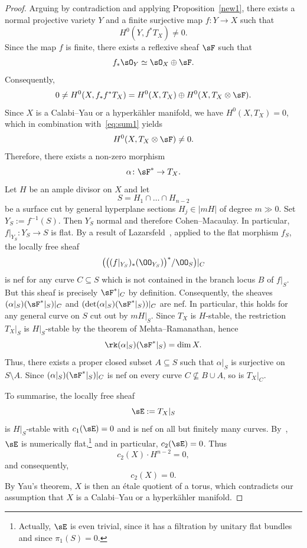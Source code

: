 \begin{proof}
Arguing by contradiction and applying Proposition~\ref{new1}, there exists a normal projective variety $Y$ and a finite surjective map $f\colon Y \to X$ such that
\[
H^0(Y, f^*T_X) \neq 0.
\]
Since the map $f$ is finite, there exists a reflexive sheaf $\sF$ such that
\[
f_*\sO_{Y} \simeq \sO_X \oplus \sF.
\]
Consequently,
\begin{equation}\label{eq:sum1}
0\neq H^0(X,f_*f^*T_X) = H^0(X, T_X)\oplus H^0(X,T_X \otimes \sF).
\end{equation}
Since $X$ is a Calabi--Yau or a hyperkähler manifold, we have $H^0(X,T_X) = 0$, which in combination with~\eqref{eq:sum1} yields
\[
H^0(X, T_X \otimes \sF) \ne 0.
\]
Therefore, there exists a non-zero morphism
\[
\alpha\colon \sF^* \to T_X.
\]
Let $H$ be an ample divisor on $X$ and let
\[
S = H_1 \cap \ldots \cap H_{n-2}
\]
be a surface cut by general hyperplane sections $H_j \in | mH | $ of degree $m \gg 0$. Set $Y_S := f^{-1}(S)$. Then $Y_S$ normal and therefore Cohen--Macaulay. In particular, $f|_{Y_S}\colon Y_S \to S$ is flat. By a result of Lazarsfeld~\cite[Appendix, Proposition~A]{PS00}, applied to the flat morphism $f_S$, the locally free sheaf
\[
\big(\big((f|_{Y_S})_*(\OO_{Y_S})\big)^*/\OO_S\big)|_C
\]
is nef for any curve $C \subseteq S$ which is not contained in the branch locus $B$ of $f|_S$. But this sheaf is precisely $\sF^*|_C$ by definition. Consequently, the sheaves $(\alpha|_S)(\sF^*|_S){|_C}$ and $(\det (\alpha|_S)(\sF^*|_S)){|_C}$ are nef. In particular, this holds for any general curve on $S$ cut out by $mH|_S$. Since $T_X$ is $H$-stable, the restriction $T_X|_S$ is $H|_S$-stable by the theorem of Mehta--Ramanathan, hence
\[
\rk(\alpha|_S)(\sF^*|_S)=\dim X.
\]
Thus, there exists a proper closed subset $A\subseteq S$ such that $\alpha|_S$ is surjective on $S \setminus A $. Since $(\alpha|_S)(\sF^*|_S){|_C}$ is nef on every curve $C \not \subseteq B \cup A$, so is ${T_X}|_C$.

To summarise, the locally free sheaf
\[
\sE := T_X|_S
\]
is $H|_S$-stable with $c_1(\sE) = 0$ and is nef on all but finitely many curves. By~\cite[Corollary~5.4]{HP17}, $\sE$ is numerically flat,\footnote{Actually, $\sE$ is even trivial, since it has a filtration by unitary flat bundles and since $\pi_1(S) = 0$.} and in particular, $c_2(\sE) = 0$. Thus
\[
c_2(X) \cdot H^{n-2} = 0,
\]
and consequently,
\[
c_2(X) = 0.
\]
By Yau's theorem, $X$ is then an étale quotient of a torus, which contradicts our assumption that $X$ is a Calabi--Yau or a hyperkähler manifold.
\end{proof}


